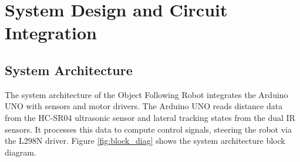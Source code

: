 \documentclass[12pt,a4paper,oneside]{report}
\begin{document}
\chapter{System Design and Circuit Integration}
\section{System Architecture}
The system architecture of the Object Following Robot integrates the Arduino UNO with sensors and motor drivers. The Arduino UNO reads distance data from the HC-SR04 ultrasonic sensor and lateral tracking states from the dual IR sensors. It processes this data to compute control signals, steering the robot via the L298N driver. Figure \ref{fig:block_diag} shows the system architecture block diagram.
\end{document}
